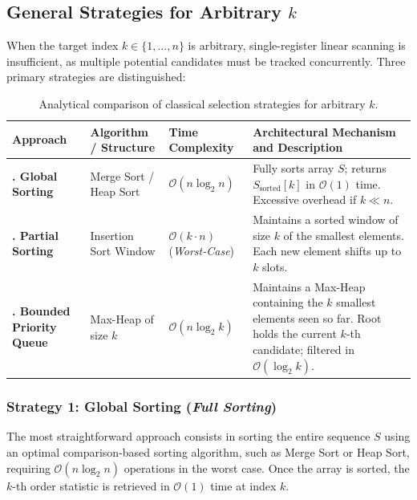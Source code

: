 \subsection{General Strategies for Arbitrary $k$}
\label{subsec:selection-general-strategies}

When the target index $k \in \{1, \dots, n\}$ is arbitrary, single-register linear scanning is insufficient, as multiple potential candidates must be tracked concurrently. Three primary strategies are distinguished:

\begin{table}[H]
  \centering
  \caption{Analytical comparison of classical selection strategies for arbitrary $k$.}
  \label{tab:selection-strategies-comparison-en}
  \begin{tabularx}{\textwidth}{@{}>{\bfseries\arraybackslash}p{}p{}p{}Y@{}}
    \toprule
    Approach & Algorithm / Structure & Time Complexity & Architectural Mechanism and Description \\
    . Global Sorting & Merge Sort / Heap Sort & $\mathcal{O}(n \log_2 n)$ & Fully sorts array $S$; returns $S_{\text{sorted}}[k]$ in $\mathcal{O}(1)$ time. Excessive overhead if $k \ll n$. \\
    . Partial Sorting & Insertion Sort Window & $\mathcal{O}(k \cdot n)$ \newline (\textit{Worst-Case}) & Maintains a sorted window of size $k$ of the smallest elements. Each new element shifts up to $k$ slots. \\
    . Bounded Priority Queue & Max-Heap of size $k$ & $\mathcal{O}(n \log_2 k)$ & Maintains a Max-Heap containing the $k$ smallest elements seen so far. Root holds the current $k$-th candidate; filtered in $\mathcal{O}(\log_2 k)$. \\
    \bottomrule
  \end{tabularx}
\end{table}

\subsubsection{Strategy 1: Global Sorting (\textit{Full Sorting})}
The most straightforward approach consists in sorting the entire sequence $S$ using an optimal comparison-based sorting algorithm, such as Merge Sort or Heap Sort, requiring $\mathcal{O}(n \log_2 n)$ operations in the worst case. Once the array is sorted, the $k$-th order statistic is retrieved in $\mathcal{O}(1)$ time at index $k$.

